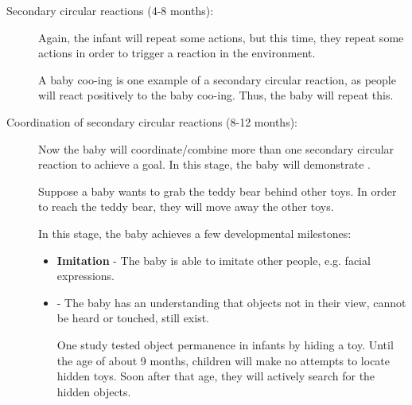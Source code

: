 \documentclass[../main/main.tex]{subfiles}
\begin{document}
\begin{description}
  \item[Secondary circular reactions (4-8 months):] Again, the infant will repeat some actions, but this time, they repeat some actions in order to trigger a reaction in the environment.
        \begin{example}
A baby coo-ing is one example of a secondary circular reaction, as people will react positively to the baby coo-ing. Thus, the baby will repeat this.
        \end{example}
    \item[Coordination of secondary circular reactions (8-12 months):] Now the baby will coordinate/combine more than one secondary circular reaction to achieve a goal. In this stage, the baby will demonstrate .
        \begin{example}
Suppose a baby wants to grab the teddy bear behind other toys. In order to reach the teddy bear, they will move away the other toys.
        \end{example}
        In this stage, the baby achieves a few developmental milestones:
        \begin{itemize}
          \item \textbf{Imitation} -
                The baby is able to imitate other people, e.g. facial expressions.
          \item {} - The baby has an understanding that objects not in their view, cannot be heard or touched, still exist.
                \begin{example}
One study tested object permanence in infants by hiding a toy. Until the age of about 9 months, children will make no attempts to locate hidden toys. Soon after that age, they will actively search for the hidden objects.
                \end{example}


\end{itemize}
\end{description}
\end{document}
